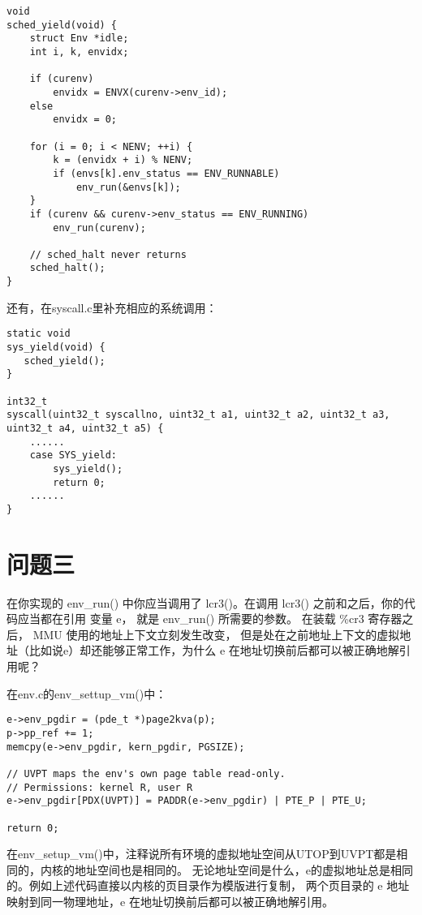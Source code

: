 \documentclass[12pt,a4paper]{article}
\begin{document}
\begin{lstlisting}[style=CPP]
void
sched_yield(void) {
    struct Env *idle;
    int i, k, envidx;

    if (curenv)
        envidx = ENVX(curenv->env_id);
    else
        envidx = 0;

    for (i = 0; i < NENV; ++i) {
        k = (envidx + i) % NENV;
        if (envs[k].env_status == ENV_RUNNABLE)
            env_run(&envs[k]);
    }
    if (curenv && curenv->env_status == ENV_RUNNING)
        env_run(curenv);

    // sched_halt never returns
    sched_halt();
}
\end{lstlisting}

还有，在syscall.c里补充相应的系统调用：

\begin{lstlisting}[style=CPP]
static void
sys_yield(void) {
   sched_yield();
}

int32_t
syscall(uint32_t syscallno, uint32_t a1, uint32_t a2, uint32_t a3, uint32_t a4, uint32_t a5) {
    ......
    case SYS_yield:
        sys_yield();
        return 0;
    ......
}
\end{lstlisting}

\section{问题三}

    在你实现的 env\_run() 中你应当调用了 lcr3()。在调用 lcr3() 之前和之后，你的代码应当都在引用 变量 e，
    就是 env\_run() 所需要的参数。 在装载 \%cr3 寄存器之后， MMU 使用的地址上下文立刻发生改变，
    但是处在之前地址上下文的虚拟地址（比如说e）却还能够正常工作，为什么 e 在地址切换前后都可以被正确地解引用呢？

    在env.c的env\_settup\_vm()中：

    \begin{lstlisting}[style=CPP]
e->env_pgdir = (pde_t *)page2kva(p);
p->pp_ref += 1;
memcpy(e->env_pgdir, kern_pgdir, PGSIZE);

// UVPT maps the env's own page table read-only.
// Permissions: kernel R, user R
e->env_pgdir[PDX(UVPT)] = PADDR(e->env_pgdir) | PTE_P | PTE_U;

return 0;
    \end{lstlisting}

    在env\_setup\_vm()中，注释说所有环境的虚拟地址空间从UTOP到UVPT都是相同的，内核的地址空间也是相同的。
    无论地址空间是什么，e的虚拟地址总是相同的。例如上述代码直接以内核的页目录作为模版进行复制，
    两个页目录的 e 地址映射到同一物理地址，e 在地址切换前后都可以被正确地解引用。
\end{document}
